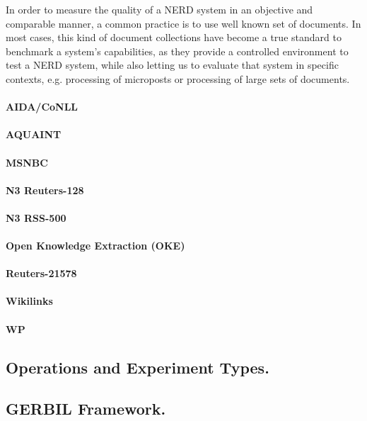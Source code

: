 In order to measure the quality of a NERD system in an objective and comparable manner, a common practice is to use well known set of documents. In most cases, this kind of document collections have become a true standard to benchmark a system's capabilities, as they provide a controlled environment to test a NERD system, while also letting us to evaluate that system in specific contexts, e.g. processing of microposts or processing of large sets of documents. 

\paragraph{AIDA/CoNLL}     

\paragraph{AQUAINT}     

\paragraph{MSNBC}     

\paragraph{N3 Reuters-128}     

\paragraph{N3 RSS-500}     

\paragraph{Open Knowledge Extraction (OKE)}     

\paragraph{Reuters-21578}     

\paragraph{Wikilinks}     

\paragraph{WP} 



\subsection{Operations and Experiment Types.}




  



\subsection{GERBIL Framework.}
